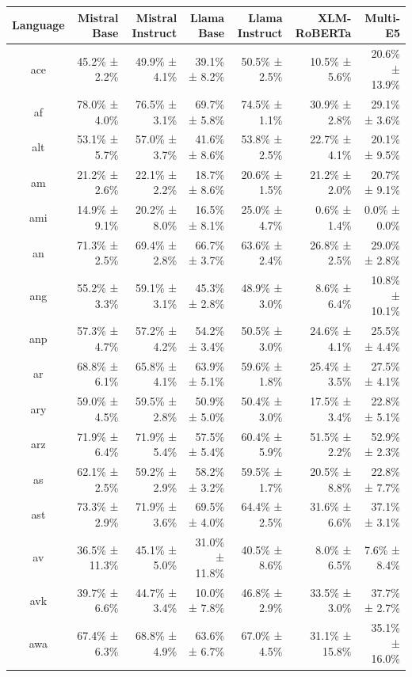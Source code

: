 \documentclass[10pt, a4paper]{article}
\begin{document}
\begin{table}[h]
\centering
\scriptsize
\begin{tabular}{crrrrrr}
\hline
\textbf{Language} & \textbf{Mistral Base} & \textbf{Mistral Instruct} & \textbf{Llama Base} & \textbf{Llama Instruct} & \textbf{XLM-RoBERTa} & \textbf{Multi-E5} \\
\hline
ace & 45.2\% ± 2.2\% & 49.9\% ± 4.1\% & 39.1\% ± 8.2\% & 50.5\% ± 2.5\% & 10.5\% ± 5.6\% & 20.6\% ± 13.9\% \\
af & 78.0\% ± 4.0\% & 76.5\% ± 3.1\% & 69.7\% ± 5.8\% & 74.5\% ± 1.1\% & 30.9\% ± 2.8\% & 29.1\% ± 3.6\% \\
alt & 53.1\% ± 5.7\% & 57.0\% ± 3.7\% & 41.6\% ± 8.6\% & 53.8\% ± 2.5\% & 22.7\% ± 4.1\% & 20.1\% ± 9.5\% \\
am & 21.2\% ± 2.6\% & 22.1\% ± 2.2\% & 18.7\% ± 8.6\% & 20.6\% ± 1.5\% & 21.2\% ± 2.0\% & 20.7\% ± 9.1\% \\
ami & 14.9\% ± 9.1\% & 20.2\% ± 8.0\% & 16.5\% ± 8.1\% & 25.0\% ± 4.7\% & 0.6\% ± 1.4\% & 0.0\% ± 0.0\% \\
an & 71.3\% ± 2.5\% & 69.4\% ± 2.8\% & 66.7\% ± 3.7\% & 63.6\% ± 2.4\% & 26.8\% ± 2.5\% & 29.0\% ± 2.8\% \\
ang & 55.2\% ± 3.3\% & 59.1\% ± 3.1\% & 45.3\% ± 2.8\% & 48.9\% ± 3.0\% & 8.6\% ± 6.4\% & 10.8\% ± 10.1\% \\
anp & 57.3\% ± 4.7\% & 57.2\% ± 4.2\% & 54.2\% ± 3.4\% & 50.5\% ± 3.0\% & 24.6\% ± 4.1\% & 25.5\% ± 4.4\% \\
ar & 68.8\% ± 6.1\% & 65.8\% ± 4.1\% & 63.9\% ± 5.1\% & 59.6\% ± 1.8\% & 25.4\% ± 3.5\% & 27.5\% ± 4.1\% \\
ary & 59.0\% ± 4.5\% & 59.5\% ± 2.8\% & 50.9\% ± 5.0\% & 50.4\% ± 3.0\% & 17.5\% ± 3.4\% & 22.8\% ± 5.1\% \\
arz & 71.9\% ± 6.4\% & 71.9\% ± 5.4\% & 57.5\% ± 5.4\% & 60.4\% ± 5.9\% & 51.5\% ± 2.2\% & 52.9\% ± 2.3\% \\
as & 62.1\% ± 2.5\% & 59.2\% ± 2.9\% & 58.2\% ± 3.2\% & 59.5\% ± 1.7\% & 20.5\% ± 8.8\% & 22.8\% ± 7.7\% \\
ast & 73.3\% ± 2.9\% & 71.9\% ± 3.6\% & 69.5\% ± 4.0\% & 64.4\% ± 2.5\% & 31.6\% ± 6.6\% & 37.1\% ± 3.1\% \\
av & 36.5\% ± 11.3\% & 45.1\% ± 5.0\% & 31.0\% ± 11.8\% & 40.5\% ± 8.6\% & 8.0\% ± 6.5\% & 7.6\% ± 8.4\% \\
avk & 39.7\% ± 6.6\% & 44.7\% ± 3.4\% & 10.0\% ± 7.8\% & 46.8\% ± 2.9\% & 33.5\% ± 3.0\% & 37.7\% ± 2.7\% \\
awa & 67.4\% ± 6.3\% & 68.8\% ± 4.9\% & 63.6\% ± 6.7\% & 67.0\% ± 4.5\% & 31.1\% ± 15.8\% & 35.1\% ± 16.0\% \\

\end{tabular}
\end{table}
\end{document}
